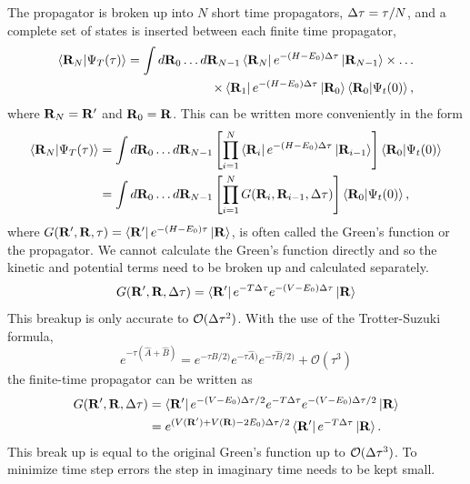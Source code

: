 The propagator is broken up into $N$ short time propagators, $\Delta\tau = \tau/N$, and a complete set of states is inserted between each finite time propagator,
\begin{equation}
\begin{split}
   \left< \mathbf{R}_N | \Psi_T(\tau) \right> = \int d\mathbf{R}_0 \ldots d\mathbf{R}_{N-1} \left< \mathbf{R}_N \right|e^{-(H-E_0)\Delta\tau}\left| \mathbf{R}_{N-1} \right> \times \ldots \\
      \times \left< \mathbf{R}_1 \right|e^{-(H-E_0)\Delta\tau}\left| \mathbf{R}_{0} \right> \left< \mathbf{R}_0 | \Psi_t(0) \right>,
\end{split}
\end{equation}
where $\mathbf{R}_N=\mathbf{R}'$ and $\mathbf{R}_0=\mathbf{R}$. This can be written more conveniently in the form
\begin{align}
   \left< \mathbf{R}_N | \Psi_T(\tau) \right> &= \int d\mathbf{R}_0 \ldots d\mathbf{R}_{N-1} \left[\prod\limits_{i=1}^N \left< \mathbf{R}_i \right|e^{-(H-E_0)\Delta\tau}\left| \mathbf{R}_{i-1} \right>\right] \left< \mathbf{R}_0 | \Psi_t(0) \right> \\
   &= \int d\mathbf{R}_0 \ldots d\mathbf{R}_{N-1} \left[\prod\limits_{i=1}^N G(\mathbf{R}_i,\mathbf{R}_{i-1},\Delta\tau)\right] \left< \mathbf{R}_0 | \Psi_t(0) \right>,
\end{align}
where $G(\mathbf{R}',\mathbf{R},\tau)=\left< \mathbf{R}' \right|e^{-(H-E_0)\tau}\left| \mathbf{R} \right>$, is often called the Green's function or the propagator. We cannot calculate the Green's function directly and so the kinetic and potential terms need to be broken up and calculated separately.
\begin{equation}
   G(\mathbf{R}',\mathbf{R},\Delta\tau) = \left< \mathbf{R}' \right|e^{-T\Delta\tau}e^{-(V-E_0)\Delta\tau}\left| \mathbf{R} \right>
\end{equation}
This breakup is only accurate to $\mathcal{O}(\Delta\tau^2)$. With the use of the Trotter-Suzuki formula,
\begin{equation}
   e^{-\tau\left(\hat{A}+\hat{B}\right)} = e^{-\tau\hat{B}/2)}e^{-\tau\hat{A})}e^{-\tau\hat{B}/2)} + \mathcal{O}(\tau^3)
\end{equation}
the finite-time propagator can be written as
\begin{align}
   G(\mathbf{R}',\mathbf{R},\Delta\tau) &= \left< \mathbf{R}' \right|e^{-(V-E_0)\Delta\tau/2}e^{-T\Delta\tau}e^{-(V-E_0)\Delta\tau/2}\left| \mathbf{R} \right> \\
   &= e^{(V(\mathbf{R}')+V(\mathbf{R})-2E_0)\Delta\tau/2}\left< \mathbf{R}' \right|e^{-T\Delta\tau}\left| \mathbf{R} \right>.
\end{align}
This break up is equal to the original Green's function up to $\mathcal{O}(\Delta\tau^3)$. To minimize time step errors the step in imaginary time needs to be kept small.

